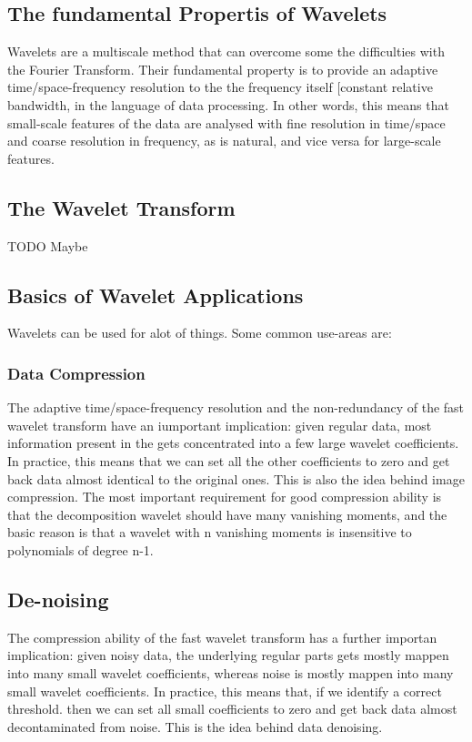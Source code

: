 \documentclass[12pt]{article}
\begin{document}
	\subsection{The fundamental Propertis of Wavelets}
	Wavelets are a multiscale method that can overcome some the difficulties with the Fourier Transform. Their fundamental
	property is to provide an adaptive time/space-frequency resolution to the the frequency itself [constant relative bandwidth, in the  
	language of data processing. In other words, this means that small-scale features of the data are analysed with fine resolution in
	time/space and coarse resolution in frequency, as is natural, and vice versa for large-scale features.
	 
	 \subsection{The Wavelet Transform}
	 TODO Maybe
	 
	 \subsection{Basics of Wavelet Applications}
	 Wavelets can be used for alot of things. Some common use-areas are:
	    
	    \subsubsection{Data Compression}
	    The adaptive time/space-frequency resolution and the non-redundancy of the fast wavelet transform have an iumportant implication: 
	    given regular data, most information present in the gets concentrated into a few large
	    wavelet coefficients. In practice, this means that we can set all the
	    other coefficients to zero and get back data almost identical to the
	    original ones. This is also the idea behind image compression. The most
	    important requirement for good compression ability is that the
	    decomposition wavelet should have many vanishing moments, and the basic
	    reason is that a wavelet with n vanishing moments is insensitive to
	    polynomials of degree n-1. 
	    
	    \subsection{De-noising}
	    The compression ability of the fast wavelet transform has a further
	    importan implication: given noisy data, the underlying regular parts gets
	    mostly mappen into many small wavelet coefficients, whereas noise is
	    mostly mappen into many small wavelet coefficients. In practice, this
	    means that, if we identify a correct threshold. then we can set all small
	    coefficients to zero and get back data almost decontaminated from noise.
	    This is the idea behind data denoising.
%	
%
\end{document}

